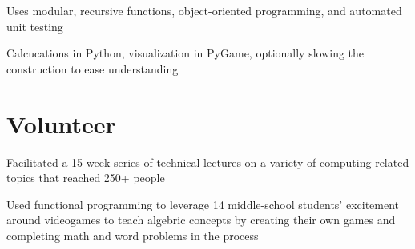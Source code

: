 \documentclass[letterpaper]{deedy-resume} %
\begin{document}
\begin{minipage}[t]{0.66\textwidth}
Uses modular, recursive functions, object-oriented programming, and automated unit testing \\
\sectionspace %


Calcucations in Python, visualization in PyGame, optionally slowing the construction to ease understanding \\
\sectionspace %

\section{Volunteer}


\begin{tightitemize}
\item Facilitated a 15-week series of technical lectures on a variety of computing-related topics that reached 250+ people
\end{tightitemize}

\sectionspace %



\begin{tightitemize}
\item Used functional programming to leverage 14 middle-school students' excitement around videogames to teach algebric concepts by creating their own games and completing math and word problems in the process
\end{tightitemize}

\sectionspace %


\end{minipage} %
\end{document}
